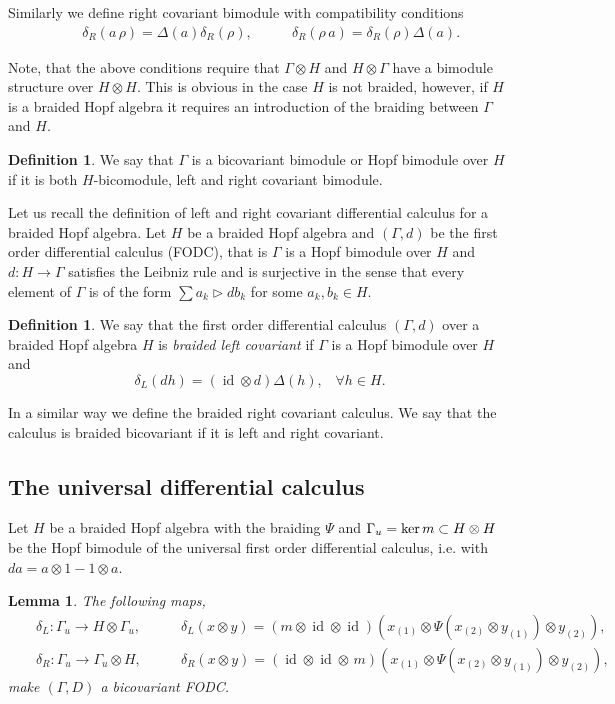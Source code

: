 \documentclass[12pt]{amsart}
\newtheorem{lem}[thm]{Lemma}
\theoremstyle{definition}
\newtheorem{defn}[thm]{Definition}
\numberwithin{equation}{section}
\newcommand{\ox}{\otimes}           %
\DeclareMathOperator{\id}{id}       %
\begin{document}
Similarly we define right covariant bimodule with compatibility conditions
$$
\begin{aligned}
&&\delta_R(a\,\rho)=\Delta(a) \delta_R(\rho), \qquad
&\delta_R(\rho \, a)=\delta_R(\rho)\Delta(a).
\end{aligned}
$$

Note, that the above conditions require that $\Gamma \ox H$ and $H \ox \Gamma$
have a bimodule structure over $H \ox H$. This is obvious in the case $H$ is not
braided, however, if $H$ is a braided Hopf algebra it requires an introduction of the braiding between $\Gamma$ and $H$.

\begin{defn}
We say that $\Gamma$ is a bicovariant bimodule or Hopf bimodule over $H$ if it is both $H$-bicomodule, left and right covariant bimodule.
\end{defn}


Let us recall the definition of left and right covariant differential calculus for
a braided Hopf algebra. Let $H$ be a braided Hopf algebra and $(\Gamma, d)$ be the
first order differential calculus (FODC), that is $\Gamma$ is a Hopf bimodule over 
$H$ and $d: H \to \Gamma$ satisfies the Leibniz rule and is surjective in the sense 
that every element of $\Gamma$ is of the form $\sum a_k\rhd db_k$ for some 
$a_k,b_k\in H$.


\begin{defn} We say that the first order differential calculus $(\Gamma, d)$ 
	over a braided Hopf
	algebra $H$ is  {\em braided left covariant} if $\Gamma$ is a Hopf bimodule over $H$ and
	$$ \delta_L (d h) = (\id \otimes d) \Delta(h), \;\;\; \forall h \in H. $$
\end{defn}

In a similar way we define the braided right covariant calculus. We say that the
calculus is braided bicovariant if it is left and right covariant.

\subsection{The universal differential calculus}

Let $H$ be a braided Hopf algebra with the braiding $\Psi$ 
and $\Gamma_u = \hbox{ker}\, m \subset H \otimes H$ 
be the Hopf bimodule of the universal first order differential 
calculus, i.e. with $da=a\ox 1-1\ox a$.

\begin{lem}
The following maps,
$$
\begin{aligned}
&&\delta_L: \Gamma_u \rightarrow H \otimes \Gamma_u, \qquad
&\delta_L(x \otimes y) = (m \otimes \id \otimes \id)  (x_{(1)} \otimes 
\Psi( x_{(2)} \otimes  y_{(1)}) \otimes y_{(2)}), \\
&&\delta_R: \Gamma_u \rightarrow \Gamma_u \otimes H, \qquad
&\delta_R(x \otimes y) =  (\id \otimes \id \otimes\, m) (x_{(1)} \otimes \Psi( x_{(2)} \otimes  y_{(1)}) \otimes y_{(2)}),
\end{aligned}
$$
make $(\Gamma, D)$ a bicovariant FODC.
\end{lem}
\end{document}
